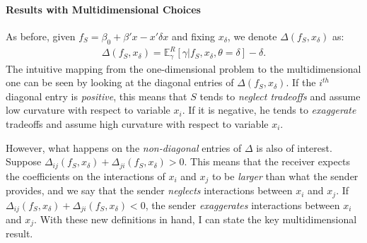 \documentclass[11pt,dvipsnames]{article}
\begin{document}


\paragraph{Results with Multidimensional Choices}
As before, given $f_S = \beta_0+ \beta'x - x' \delta x$ and fixing $x_\delta$, we denote $\Delta(f_S,x_\delta)$ as:
\begin{align*}
\Delta(f_S,x_\delta) = \mathbb{E}_\gamma^R[\gamma|f_S,x_\delta,\theta=\delta]-\delta.
\end{align*}
The intuitive mapping from the one-dimensional problem to the multidimensional one can be seen by looking at the diagonal entries of $\Delta(f_S,x_\delta)$.
If the $i^{th}$ diagonal entry is \emph{positive}, this means that $S$ tends to \emph{neglect tradeoffs} and assume low curvature with respect to variable $x_i$.
If it is negative, he tends to \emph{exaggerate} tradeoffs and assume high curvature with respect to variable $x_i$.

However, what happens on the \emph{non-diagonal} entries of $\Delta$ is also of interest. Suppose $\Delta_{ij}(f_S,x_\delta)+\Delta_{ji}(f_S,x_\delta) > 0$. This means that the receiver expects the coefficients on the interactions of $x_i$ and $x_j$ to be \emph{larger} than what the sender provides, and we say that the sender \emph{neglects} interactions between $x_i$ and $x_j$.
If $\Delta_{ij}(f_S,x_\delta)+\Delta_{ji}(f_S,x_\delta) < 0$, the sender \emph{exaggerates} interactions between $x_i$ and $x_j$.
With these new definitions in hand, I can state the key multidimensional result.
\end{document}
